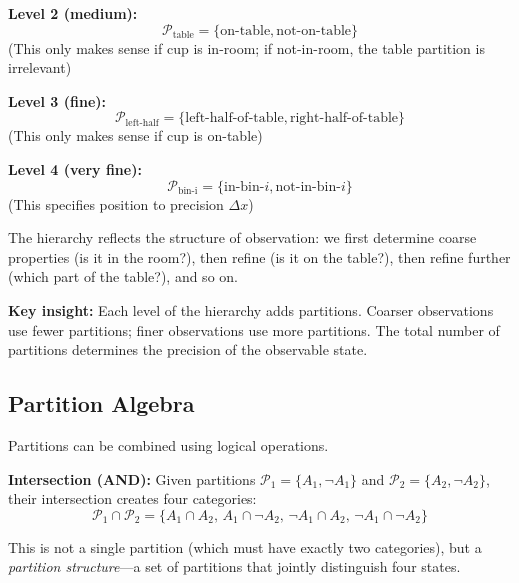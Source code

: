 \documentclass[twocolumn,10pt]{article}
\theoremstyle{definition}
\theoremstyle{remark}
\begin{document}
\textbf{Level 2 (medium):}
\begin{equation}
\mathcal{P}_{\text{table}} = \{\text{on-table}, \text{not-on-table}\}
\end{equation}
(This only makes sense if cup is in-room; if not-in-room, the table partition is irrelevant)

\textbf{Level 3 (fine):}
\begin{equation}
\mathcal{P}_{\text{left-half}} = \{\text{left-half-of-table}, \text{right-half-of-table}\}
\end{equation}
(This only makes sense if cup is on-table)

\textbf{Level 4 (very fine):}
\begin{equation}
\mathcal{P}_{\text{bin-i}} = \{\text{in-bin-}i, \text{not-in-bin-}i\}
\end{equation}
(This specifies position to precision $\Delta x$)

\vspace{0.2cm}
\noindent The hierarchy reflects the structure of observation: we first determine coarse properties (is it in the room?), then refine (is it on the table?), then refine further (which part of the table?), and so on.

\vspace{0.2cm}
\noindent\textbf{Key insight:} Each level of the hierarchy adds partitions. Coarser observations use fewer partitions; finer observations use more partitions. The total number of partitions determines the precision of the observable state.

\subsection{Partition Algebra}

Partitions can be combined using logical operations.

\vspace{0.2cm}
\noindent\textbf{Intersection (AND):} Given partitions $\mathcal{P}_1 = \{A_1, \neg A_1\}$ and $\mathcal{P}_2 = \{A_2, \neg A_2\}$, their intersection creates four categories:
\begin{equation}
\mathcal{P}_1 \cap \mathcal{P}_2 = \{A_1 \cap A_2, \, A_1 \cap \neg A_2, \, \neg A_1 \cap A_2, \, \neg A_1 \cap \neg A_2\}
\end{equation}

This is not a single partition (which must have exactly two categories), but a \textit{partition structure}—a set of partitions that jointly distinguish four states.
\end{document}
